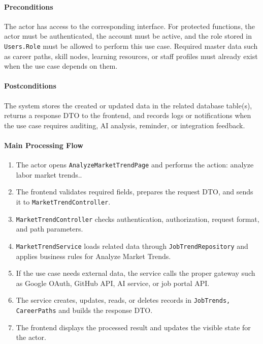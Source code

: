 \paragraph{Preconditions}

The actor has access to the corresponding interface. For protected functions, the actor must be authenticated, the account must be active, and the role stored in \texttt{Users.Role} must be allowed to perform this use case. Required master data such as career paths, skill nodes, learning resources, or staff profiles must already exist when the use case depends on them.

\paragraph{Postconditions}

The system stores the created or updated data in the related database table(s), returns a response DTO to the frontend, and records logs or notifications when the use case requires auditing, AI analysis, reminder, or integration feedback.

\paragraph{Main Processing Flow}

\begin{enumerate}
    \item The actor opens \texttt{AnalyzeMarketTrendPage} and performs the action: analyze labor market trends..
    \item The frontend validates required fields, prepares the request DTO, and sends it to \texttt{MarketTrendController}.
    \item \texttt{MarketTrendController} checks authentication, authorization, request format, and path parameters.
    \item \texttt{MarketTrendService} loads related data through \texttt{JobTrendRepository} and applies business rules for Analyze Market Trends.
    \item If the use case needs external data, the service calls the proper gateway such as Google OAuth, GitHub API, AI service, or job portal API.
    \item The service creates, updates, reads, or deletes records in \texttt{JobTrends, CareerPaths} and builds the response DTO.
    \item The frontend displays the processed result and updates the visible state for the actor.
\end{enumerate}

